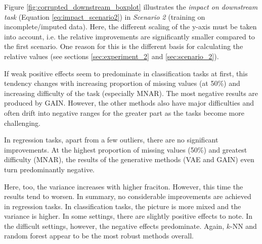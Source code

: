 Figure \ref{fig:corrupted_downstream_boxplot} illustrates the \textit{impact on downstream task} (Equation \ref{eq:impact_scenario2}) in \textit{Scenario 2} (training on incomplete/imputed data). Here, the different scaling of the y-axis must be taken into account, i.e. the relative improvements are significantly smaller compared to the first scenario. One reason for this is the different basis for calculating the relative values (see sections \ref{sec:experiment_2} and \ref{sec:scenario_2}).

If weak positive effects seem to predominate in classification tasks at first, this tendency changes with increasing proportion of missing values (at 50\%) and increasing difficulty of the task (especially MNAR). The most negative results are produced by GAIN. However, the other methods also have major difficulties and often drift into negative ranges for the greater part as the tasks become more challenging.

In regression tasks, apart from a few outliers, there are no significant improvements. At the highest proportion of missing values (50\%) and greatest difficulty (MNAR), the results of the generative methods (VAE and GAIN) even turn predominantly negative.

Here, too, the variance increases with higher fraciton. However, this time the results tend to worsen. In summary, no considerable improvements are achieved in regression tasks. In classification tasks, the picture is more mixed and the variance is higher. In some settings, there are slightly positive effects to note. In the difficult settings, however, the negative effects predominate. Again, $k$-NN and random forest appear to be the most robust methods overall.

